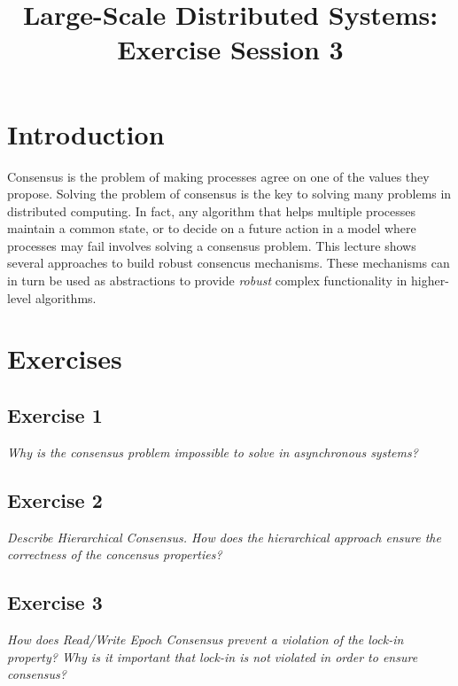 

\title{Large-Scale Distributed Systems: Exercise Session 3}
\maketitle

\section{Introduction}
\label{sec:introduction}

Consensus is the problem of making processes agree on one of the values they propose. Solving the problem of consensus is the key to solving many problems in distributed computing. In fact, any algorithm that helps multiple processes maintain a common state, or to decide on a future action in a model where processes may fail involves solving a consensus problem. This lecture shows several approaches to build robust consencus mechanisms. These mechanisms can in turn be used as abstractions to provide \emph{robust} complex functionality in higher-level algorithms.

\section{Exercises}
\label{sec:exercises}

\subsection*{Exercise 1}
\label{sec:exercise_1}

\emph{Why is the consensus problem impossible to solve in asynchronous systems?}

\subsection*{Exercise 2}
\label{sec:exercise_2}

\emph{Describe Hierarchical Consensus. How does the hierarchical approach ensure the correctness of the concensus properties?}

\subsection*{Exercise 3}
\label{sec:exercise_4}

\emph{How does Read/Write Epoch Consensus prevent a violation of the lock-in property? Why is it important that lock-in is not violated in order to ensure consensus?}

